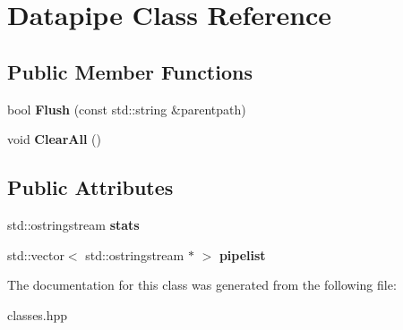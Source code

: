 \hypertarget{classDatapipe}{}\section{Datapipe Class Reference}
\label{classDatapipe}
\subsection*{Public Member Functions}
\begin{DoxyCompactItemize}
\item 
\mbox{\label{classDatapipe_a64499d3db913bfe732ef81970e2b66ee}} 
bool {\bfseries Flush} (const std\+::string \&parentpath)
\item 
\mbox{\label{classDatapipe_af265afc84bcb4f4a6baf6b4ea08b6f05}} 
void {\bfseries Clear\+All} ()
\end{DoxyCompactItemize}
\subsection*{Public Attributes}
\begin{DoxyCompactItemize}
\item 
\mbox{\label{classDatapipe_ac7a0f2b8e017832ebc9e61cb669cc543}} 
std\+::ostringstream {\bfseries stats}
\item 
\mbox{\label{classDatapipe_a37c40e3032eb859d991a869a53bbf25d}} 
std\+::vector$<$ std\+::ostringstream $\ast$ $>$ {\bfseries pipelist}
\end{DoxyCompactItemize}


The documentation for this class was generated from the following file\+:\begin{DoxyCompactItemize}
\item 
classes.\+hpp\end{DoxyCompactItemize}
